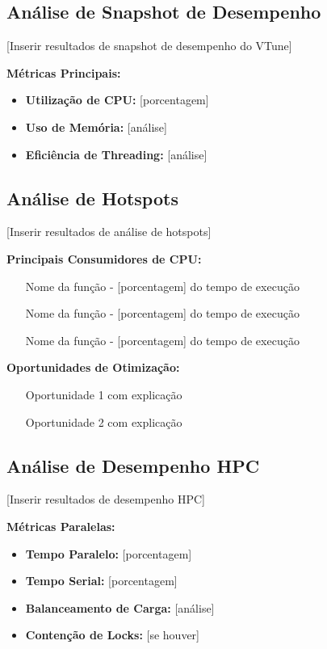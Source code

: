\documentclass[a4paper,11pt]{article}
\begin{document}
\subsection{Análise de Snapshot de Desempenho}

[Inserir resultados de snapshot de desempenho do VTune]

\textbf{Métricas Principais:}
\begin{itemize}
    \item \textbf{Utilização de CPU:} [porcentagem]
    \item \textbf{Uso de Memória:} [análise]
    \item \textbf{Eficiência de Threading:} [análise]
\end{itemize}

\subsection{Análise de Hotspots}

[Inserir resultados de análise de hotspots]

\textbf{Principais Consumidores de CPU:}
\begin{enumerate}
    \item [Nome da função] - [porcentagem] do tempo de execução
    \item [Nome da função] - [porcentagem] do tempo de execução
    \item [Nome da função] - [porcentagem] do tempo de execução
\end{enumerate}

\textbf{Oportunidades de Otimização:}
\begin{itemize}
    \item [Oportunidade 1 com explicação]
    \item [Oportunidade 2 com explicação]
\end{itemize}

\subsection{Análise de Desempenho HPC}

[Inserir resultados de desempenho HPC]

\textbf{Métricas Paralelas:}
\begin{itemize}
    \item \textbf{Tempo Paralelo:} [porcentagem]
    \item \textbf{Tempo Serial:} [porcentagem]
    \item \textbf{Balanceamento de Carga:} [análise]
    \item \textbf{Contenção de Locks:} [se houver]
\end{itemize}
\end{document}
